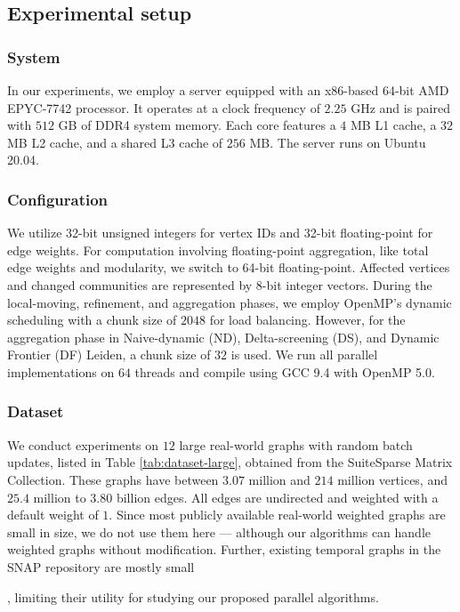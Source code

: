 \subsection{Experimental setup}
\label{sec:setup}

\subsubsection{System}
\label{sec:system}

In our experiments, we employ a server equipped with an x86-based 64-bit AMD EPYC-7742 processor. It operates at a clock frequency of $2.25$ GHz and is paired with $512$ GB of DDR4 system memory. Each core features a $4$ MB L1 cache, a $32$ MB L2 cache, and a shared L3 cache of $256$ MB. The server runs on Ubuntu 20.04.


\subsubsection{Configuration}
\label{sec:configuration}

We utilize 32-bit unsigned integers for vertex IDs and 32-bit floating-point for edge weights. For computation involving floating-point aggregation, like total edge weights and modularity, we switch to 64-bit floating-point. Affected vertices and changed communities are represented by 8-bit integer vectors. During the local-moving, refinement, and aggregation phases, we employ OpenMP's dynamic scheduling with a chunk size of $2048$ for load balancing. However, for the aggregation phase in Naive-dynamic (ND), Delta-screening (DS), and Dynamic Frontier (DF) Leiden, a chunk size of $32$ is used. We run all parallel implementations on $64$ threads and compile using GCC 9.4 with OpenMP 5.0.

\subsubsection{Dataset}
\label{sec:dataset}

We conduct experiments on $12$ large real-world graphs with random batch updates, listed in Table \ref{tab:dataset-large}, obtained from the SuiteSparse Matrix Collection. These graphs have between $3.07$ million and $214$ million vertices, and $25.4$ million to $3.80$ billion edges. All edges are undirected and weighted with a default weight of $1$. Since most publicly available real-world weighted graphs are small in size, we do not use them here --- although our algorithms can handle weighted graphs without modification. Further, existing temporal graphs in the SNAP repository \cite{snapnets} are mostly small, limiting their utility for studying our proposed parallel algorithms.

